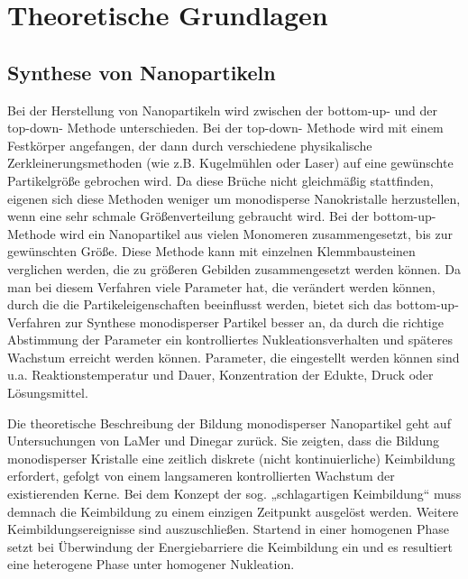 \section{Theoretische Grundlagen}
\subsection{Synthese von Nanopartikeln}
	Bei der Herstellung von Nanopartikeln wird zwischen der \glqq bottom-up\grqq - und der \glqq top-down\grqq - Methode unterschieden.
	Bei der \glqq top-down\grqq - Methode wird mit einem Festkörper angefangen, der dann durch verschiedene physikalische Zerkleinerungsmethoden (wie z.B. Kugelmühlen oder Laser) auf eine gewünschte Partikelgröße gebrochen wird.
	Da diese Brüche nicht gleichmäßig stattfinden, eigenen sich diese Methoden weniger um monodisperse Nanokristalle herzustellen, wenn eine sehr schmale Größenverteilung gebraucht wird.
	Bei der \glqq bottom-up\grqq - Methode wird ein Nanopartikel aus vielen Monomeren zusammengesetzt, bis zur gewünschten Größe.
	Diese Methode kann mit einzelnen Klemmbausteinen verglichen werden, die zu größeren Gebilden zusammengesetzt werden können.
	Da man bei diesem Verfahren viele Parameter hat, die verändert werden können, durch die die Partikeleigenschaften beeinflusst werden, bietet sich das \glqq bottom-up\grqq - Verfahren zur Synthese monodisperser Partikel besser an, da durch die richtige Abstimmung der Parameter ein kontrolliertes Nukleationsverhalten und späteres Wachstum erreicht werden können.
	Parameter, die eingestellt werden können sind u.a. Reaktionstemperatur und Dauer, Konzentration der Edukte, Druck oder Lösungsmittel.
	
	Die theoretische Beschreibung der Bildung monodisperser Nanopartikel geht auf Untersuchungen von LaMer und Dinegar zurück.\autocite{Lamer1950}
	Sie zeigten, dass die Bildung
	monodisperser Kristalle eine zeitlich diskrete (nicht kontinuierliche) Keimbildung
	erfordert, gefolgt von einem langsameren kontrollierten Wachstum der existierenden
	Kerne.
	Bei dem Konzept der sog. „schlagartigen Keimbildung“ muss demnach die
	Keimbildung zu einem einzigen Zeitpunkt ausgelöst werden. Weitere
	Keimbildungsereignisse sind auszuschließen. Startend in einer homogenen Phase setzt
	bei Überwindung der Energiebarriere die Keimbildung ein und es resultiert eine
	heterogene Phase unter homogener Nukleation. \autocite{Park2007}
	
